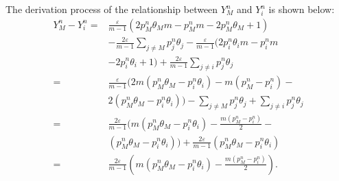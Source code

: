 \documentclass[10pt,journal,cspaper,compsoc,onecolumn]{IEEEtran}
\begin{document}
The derivation process of the relationship between $Y_M^{n}$ and $Y_i^{n}$ is shown below:
 \begin{align}
    \label{eq:26}
    Y_M^n - Y_i^n = &\displaystyle\frac{\varepsilon}{m - 1}(2p_M^n\theta_Mm - p_M^nm - 2p_M^n\theta_M + 1)\nonumber \\
    & - \displaystyle\frac{2\varepsilon}{m - 1}\sum_{j \neq M}p_j^n\theta_j - \displaystyle\frac{\varepsilon}{m - 1}(2p_i^n\theta_im - p_i^nm\nonumber\\
    & - 2p_i^n\theta_i + 1) + \displaystyle\frac{2\varepsilon}{m - 1}\sum_{j \neq i}p_j^n\theta_j \nonumber\\
    =&\displaystyle\frac{\varepsilon}{m - 1}(2m(p_M^n\theta_M - p_i^n\theta_i) - m(p_M^n - p_i^n) -\nonumber\\
    & 2(p_M^n\theta_M - p_i^n\theta_i)) - \sum_{j \neq M}p_j^n\theta_j + \sum_{j \neq i}p_j^n\theta_j     \nonumber\\ 
    =& \displaystyle\frac{2\varepsilon}{m - 1}(m(p_M^n\theta_M - p_i^n\theta_i) - \displaystyle\frac{m(p_M^n - p_i^n)}{2} - \nonumber\\
    &(p_M^n\theta_M - p_i^n\theta_i)) + \displaystyle\frac{2\varepsilon}{m-1}(p_M^n\theta_M - p_i^n\theta_i)\nonumber\\
    =&\displaystyle\frac{2\varepsilon}{m - 1}(m(p_M^n\theta_M - p_i^n\theta_i) - \displaystyle\frac{m(p_M^n - p_i^n)}{2}).
\end{align}
\end{document}
